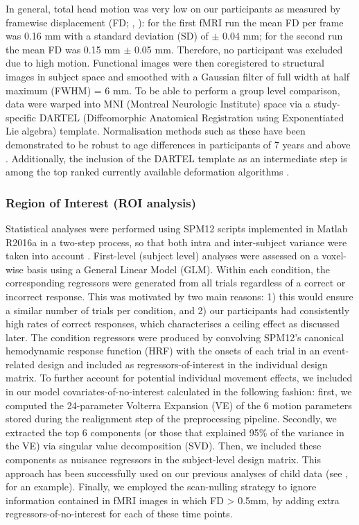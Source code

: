 In general, total head motion was very low on our participants as measured by framewise displacement (FD; \citeauthor{Power2014a}, \citeyear{Power2014a}): for the first fMRI run the mean FD per frame was 0.16 mm with a standard deviation (SD) of $\pm$ 0.04 mm; for the second run the mean FD was 0.15 mm $\pm$ 0.05 mm. Therefore, no participant was excluded due to high motion. Functional images were then coregistered to structural images in subject space and smoothed with a Gaussian filter of full width at half maximum (FWHM) = 6 mm. To be able to perform a group level comparison, data were warped into MNI (Montreal Neurologic Institute) space via a study-specific DARTEL (Diffeomorphic Anatomical Registration using Exponentiated Lie algebra) template. Normalisation methods such as these have been demonstrated to be robust to age differences in participants of 7 years and above \citep{ASHBURNER1998, Burgund2002}. Additionally, the inclusion of the DARTEL template as an intermediate step is among the top ranked currently available deformation algorithms \citep{Klein2009}. 

\subsubsection{Region of Interest (ROI analysis)} \label{section:OFC_ROIanal}
Statistical analyses were performed using SPM12 scripts implemented in Matlab R2016a in a two-step process, so that both intra and inter-subject variance were taken into account \citep{Friston1995a}. First-level (subject level) analyses were assessed on a voxel-wise basis using a General Linear Model (GLM). Within each condition, the corresponding regressors were generated from all trials regardless of a correct or incorrect response. This was motivated by two main reasons: 1) this would ensure a similar number of trials per condition, and 2) our participants had consistently high rates of correct responses, which characterises a ceiling effect as discussed later. The condition regressors were produced by convolving SPM12’s canonical hemodynamic response function (HRF) with the onsets of each trial in an event-related design and included as regressors-of-interest in the individual design matrix. To further account for potential individual movement effects, we included in our model covariates-of-no-interest calculated in the following fashion: first, we computed the 24-parameter Volterra Expansion (VE) of the 6 motion parameters stored during the realignment step of the preprocessing pipeline. Secondly, we extracted the top 6 components (or those that explained 95\% of the variance in the VE) via singular value decomposition (SVD). Then, we included these components as nuisance regressors in the subject-level design matrix. This approach has been successfully used on our previous analyses of child data (see \citeauthor{Adam-Darque2018}, \citeyear{Adam-Darque2018} for an example). Finally, we employed the scan-nulling strategy \citep{Lemieux2007} to ignore information contained in fMRI images in which FD > 0.5mm, by adding extra regressors-of-no-interest for each of these time points.

